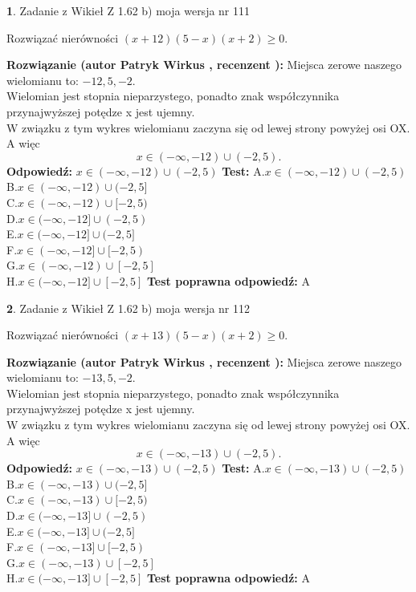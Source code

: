 \documentclass[12pt, a4paper]{article}
\theoremstyle{definition} %
\newtheorem{zad}{}
\newcommand{\zadStart}[1]{\begin{zad}#1\newline}
\newcommand{\zadStop}{\end{zad}}
\newcommand{\rozwStart}[2]{\noindent \textbf{Rozwiązanie (autor #1 , recenzent #2): }\newline}
\newcommand{\rozwStop}{\newline}
\newcommand{\odpStart}{\noindent \textbf{Odpowiedź:}\newline}
\newcommand{\odpStop}{\newline}
\newcommand{\testStart}{\noindent \textbf{Test:}\newline}
\newcommand{\testStop}{\newline}
\newcommand{\kluczStart}{\noindent \textbf{Test poprawna odpowiedź:}\newline}
\newcommand{\kluczStop}{\newline}
\begin{document}
\zadStart{Zadanie z Wikieł Z 1.62 b) moja wersja nr 111}

Rozwiązać nierówności $(x+12)(5-x)(x+2)\ge0$.
\zadStop
\rozwStart{Patryk Wirkus}{}
Miejsca zerowe naszego wielomianu to: $-12, 5, -2$.\\
Wielomian jest stopnia nieparzystego, ponadto znak współczynnika przy\linebreak najwyższej potędze x jest ujemny.\\ W związku z tym wykres wielomianu zaczyna się od lewej strony powyżej osi OX. A więc $$x \in (-\infty,-12) \cup (-2,5).$$
\rozwStop
\odpStart
$x \in (-\infty,-12) \cup (-2,5)$
\odpStop
\testStart
A.$x \in (-\infty,-12) \cup (-2,5)$\\
B.$x \in (-\infty,-12) \cup (-2,5]$\\
C.$x \in (-\infty,-12) \cup [-2,5)$\\
D.$x \in (-\infty,-12] \cup (-2,5)$\\
E.$x \in (-\infty,-12] \cup (-2,5]$\\
F.$x \in (-\infty,-12] \cup [-2,5)$\\
G.$x \in (-\infty,-12) \cup [-2,5]$\\
H.$x \in (-\infty,-12] \cup [-2,5]$
\testStop
\kluczStart
A
\kluczStop



\zadStart{Zadanie z Wikieł Z 1.62 b) moja wersja nr 112}

Rozwiązać nierówności $(x+13)(5-x)(x+2)\ge0$.
\zadStop
\rozwStart{Patryk Wirkus}{}
Miejsca zerowe naszego wielomianu to: $-13, 5, -2$.\\
Wielomian jest stopnia nieparzystego, ponadto znak współczynnika przy\linebreak najwyższej potędze x jest ujemny.\\ W związku z tym wykres wielomianu zaczyna się od lewej strony powyżej osi OX. A więc $$x \in (-\infty,-13) \cup (-2,5).$$
\rozwStop
\odpStart
$x \in (-\infty,-13) \cup (-2,5)$
\odpStop
\testStart
A.$x \in (-\infty,-13) \cup (-2,5)$\\
B.$x \in (-\infty,-13) \cup (-2,5]$\\
C.$x \in (-\infty,-13) \cup [-2,5)$\\
D.$x \in (-\infty,-13] \cup (-2,5)$\\
E.$x \in (-\infty,-13] \cup (-2,5]$\\
F.$x \in (-\infty,-13] \cup [-2,5)$\\
G.$x \in (-\infty,-13) \cup [-2,5]$\\
H.$x \in (-\infty,-13] \cup [-2,5]$
\testStop
\kluczStart
A
\kluczStop
\end{document}
